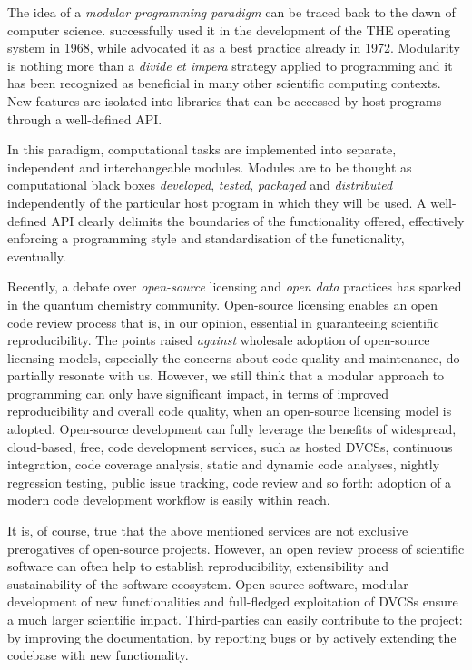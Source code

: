The idea of a \emph{modular programming paradigm} can be traced back to
the dawn of computer science. \citeauthor{Dijkstra1968-zp}
successfully used it in the development of the THE operating
system in 1968,\autocite{Dijkstra1968-zp} while
\citeauthor{Parnas1972-im} advocated it as a best practice already in
1972.\autocite{Parnas1972-im}
Modularity is nothing more than a \emph{divide et impera} strategy
applied to programming and it has been recognized as beneficial in many
other scientific computing contexts.
New features are isolated into libraries that can be accessed by host
programs through a well-defined \gls{API}.

In this paradigm, computational tasks are implemented into separate,
independent and interchangeable modules.
Modules are to be thought as computational black boxes \emph{developed},
\emph{tested}, \emph{packaged} and \emph{distributed} independently of
the particular host program in which they will be used.
A well-defined \gls{API} clearly delimits the boundaries of the functionality
offered, effectively enforcing a programming style and standardisation of the
functionality, eventually.\autocite{Reddy2011-sd}

Recently, a debate over \emph{open-source}
licensing\autocite{St_Laurent2004-fa} and \emph{open data} practices has
sparked in the quantum chemistry community.\autocite{Gezelter2015-gz, Krylov2015-fs,
Jacob2016-oq}
Open-source licensing enables an open code review process that is, in
our opinion, essential in guaranteeing scientific
reproducibility.\autocite{Gezelter2015-gz}
The points raised \emph{against} wholesale adoption of open-source
licensing models,\autocite{Krylov2015-fs} especially the concerns about
code quality and maintenance, do partially resonate with us.
However, we still think that a modular approach to programming can only
have significant impact, in terms of improved reproducibility and
overall code quality, when an open-source licensing model is adopted.
Open-source development can fully leverage the benefits of widespread,
cloud-based, free, code development services, such as hosted
\acp{DVCS},\autocite{github, gitlab} continuous
integration,\autocite{travis-ci, magnum-ci, appveyor-ci} code
coverage analysis,\autocite{coveralls} static and dynamic code
analyses,\autocite{coverity-scan} nightly regression testing, public
issue tracking, code review and so forth: adoption of a modern code
development workflow is easily within reach.

It is, of course, true that the above mentioned services are not
exclusive prerogatives of open-source projects. However, an open review
process of scientific software can often help to establish
reproducibility, extensibility and sustainability of the software
ecosystem.
Open-source software, modular development of new functionalities and
full-fledged exploitation of \acsp{DVCS} ensure a much larger scientific
impact. Third-parties can easily contribute to the project: by improving
the documentation, by reporting bugs or by actively extending the
codebase with new functionality.

